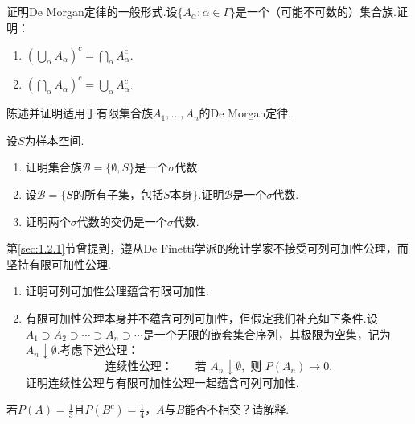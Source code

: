 \begin{exercise}\label{exercise:1.9}
证明De Morgan定律的一般形式.设$\{A_\alpha:\alpha\in\Gamma\}$是一个（可能不可数的）集合族.证明：
\begin{enumerate}
\item[(a)] $(\bigcup_\alpha A_\alpha)^c=\bigcap_\alpha A_\alpha^c$.
\item[(b)] $(\bigcap_\alpha A_\alpha)^c=\bigcup_\alpha A_\alpha^c$.
\end{enumerate}
\end{exercise}

\begin{exercise}\label{exercise:1.10}
陈述并证明适用于有限集合族$A_1,\ldots,A_n$的De Morgan定律.
\end{exercise}

\begin{exercise}\label{exercise:1.11}
设$S$为样本空间.
\begin{enumerate}
\item[(a)] 证明集合族$\mathscr{B}=\{\emptyset,S\}$是一个$\sigma$代数.
\item[(b)] 设$\mathscr{B}=\{S\text{的所有子集，包括}S\text{本身}\}$.证明$\mathscr{B}$是一个$\sigma$代数.
\item[(c)] 证明两个$\sigma$代数的交仍是一个$\sigma$代数.
\end{enumerate}
\end{exercise}

\begin{exercise}\label{exercise:1.12}
第\ref{sec:1.2.1}节曾提到，遵从De Finetti学派的统计学家不接受可列可加性公理，而坚持有限可加性公理.
\begin{enumerate}
\item[(a)] 证明可列可加性公理蕴含有限可加性.
\item[(b)] 有限可加性公理本身并不蕴含可列可加性，但假定我们补充如下条件.设$A_1\supset A_2\supset\cdots\supset A_n\supset\cdots$是一个无限的嵌套集合序列，其极限为空集，记为$A_n\downarrow\emptyset$.考虑下述公理：
$$
\textbf{连续性公理：}\qquad
\text{若 }A_n\downarrow\emptyset,\text{ 则 }P(A_n)\to0.
$$
证明连续性公理与有限可加性公理一起蕴含可列可加性.
\end{enumerate}
\end{exercise}

\begin{exercise}\label{exercise:1.13}
若$P(A)=\frac13$且$P(B^c)=\frac14$，$A$与$B$能否不相交？请解释.
\end{exercise}

